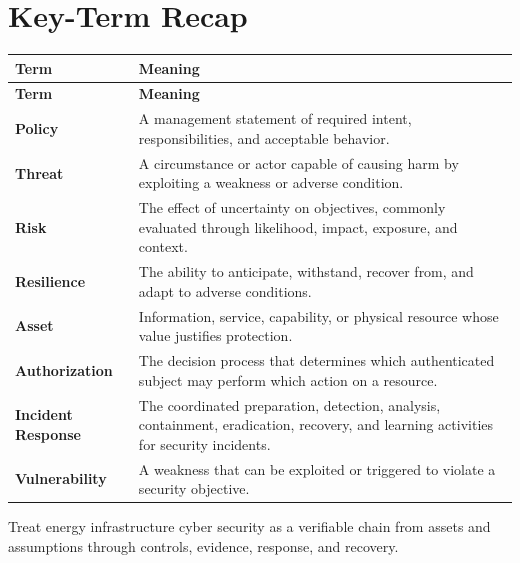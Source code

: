 \documentclass[11pt]{article}
\begin{document}
\section*{Key-Term Recap}
\begin{longtable}{>{\RaggedRight\arraybackslash}p{}>{\RaggedRight\arraybackslash}p{}}
\toprule\rowcolor{Navy}\color{white}\textbf{Term} & \color{white}\textbf{Meaning}\\\midrule
\endfirsthead
\toprule\rowcolor{Navy}\color{white}\textbf{Term} & \color{white}\textbf{Meaning}\\\midrule
\endhead
\textbf{Policy} & A management statement of required intent, responsibilities, and acceptable behavior. \\\midrule
\textbf{Threat} & A circumstance or actor capable of causing harm by exploiting a weakness or adverse condition. \\\midrule
\textbf{Risk} & The effect of uncertainty on objectives, commonly evaluated through likelihood, impact, exposure, and context. \\\midrule
\textbf{Resilience} & The ability to anticipate, withstand, recover from, and adapt to adverse conditions. \\\midrule
\textbf{Asset} & Information, service, capability, or physical resource whose value justifies protection. \\\midrule
\textbf{Authorization} & The decision process that determines which authenticated subject may perform which action on a resource. \\\midrule
\textbf{Incident Response} & The coordinated preparation, detection, analysis, containment, eradication, recovery, and learning activities for security incidents. \\\midrule
\textbf{Vulnerability} & A weakness that can be exploited or triggered to violate a security objective. \\\midrule
\bottomrule
\end{longtable}
\begin{takeawaybox}
Treat energy infrastructure cyber security as a verifiable chain from assets and assumptions through controls, evidence, response, and recovery.
\end{takeawaybox}
\end{document}

